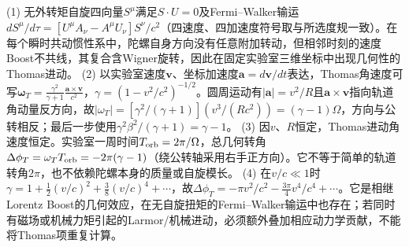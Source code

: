 (1) 无外转矩自旋四向量\(S^\mu\)满足\(S\cdot U=0\)及Fermi–Walker输运\(dS^\mu/d\tau=[U^\mu A_\nu-A^\mu U_\nu]S^\nu/c^2\)（四速度、四加速度符号取与所选度规一致）。在每个瞬时共动惯性系中，陀螺自身方向没有任意附加转动，但相邻时刻的速度Boost不共线，其复合含Wigner旋转，因此在固定实验室三维坐标中出现几何性的Thomas进动。
(2) 以实验室速度\(\boldsymbol v\)、坐标加速度\(\boldsymbol a=d\boldsymbol v/dt\)表达，Thomas角速度可写\(\boldsymbol\omega_T=\frac{\gamma^2}{\gamma+1}\frac{\boldsymbol a\times\boldsymbol v}{c^2}\)，\(\gamma=(1-v^2/c^2)^{-1/2}\)。圆周运动有\(|\boldsymbol a|=v^2/R\)且\(\boldsymbol a\times\boldsymbol v\)指向轨道角动量反方向，故\(|\omega_T|=[\gamma^2/(\gamma+1)](v^3/(Rc^2))=(\gamma-1)\Omega\)，方向与公转相反；最后一步使用\(\gamma^2\beta^2/(\gamma+1)=\gamma-1\)。
(3) 因\(v\)、\(R\)恒定，Thomas进动角速度恒定。实验室一周时间\(T_{\rm orb}=2\pi/\Omega\)，总几何转角\(\Delta\phi_T=\omega_T T_{\rm orb}=-2\pi(\gamma-1)\)（绕公转轴采用右手正方向）。它不等于简单的轨道转角\(2\pi\)，也不依赖陀螺本身的质量或自旋模长。
(4) 在\(v/c\ll1\)时\(\gamma=1+\frac12(v/c)^2+\frac38(v/c)^4+\cdots\)，故\(\Delta\phi_T=-\pi v^2/c^2-\frac{3\pi}{4}v^4/c^4+\cdots\)。它是相继Lorentz Boost的几何效应，在无自旋扭矩的Fermi–Walker输运中也存在；若同时有磁场或机械力矩引起的Larmor/机械进动，必须额外叠加相应动力学贡献，不能将Thomas项重复计算。
